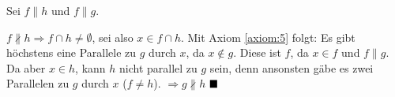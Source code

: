 
%

\begin{solution}[\ref{ub-tut-24:a1}]
    Sei $f \parallel h$ und \obda $f \parallel g$.

    $f \nparallel h \Rightarrow f \cap h \neq \emptyset$, sei also $x \in f \cap h$.
    Mit Axiom \ref{axiom:5} folgt: Es gibt höchstens eine Parallele
    zu $g$ durch $x$, da $x \notin g$. Diese ist $f$, da $x \in f$
    und $f \parallel g$. Da aber $x \in h$, kann $h$ nicht parallel
    zu $g$ sein, denn ansonsten gäbe es zwei Parallelen zu $g$ durch
    $x$ ($f \neq h$).
    $\Rightarrow g \nparallel h$ $\qed$
\end{solution}

